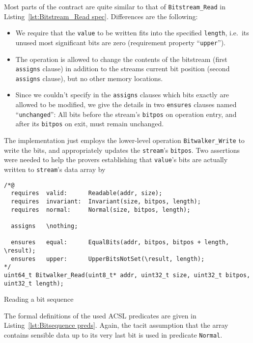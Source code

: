 Most parts of the contract are quite similar to that of
\lstinline{Bitstream_Read} in
Listing~\ref{lst:Bitstream_Read spec}.
%
Differences are the following:
\begin{itemize}
\item We require that the \lstinline{value} to be written fits into
	the specified
	\lstinline{length}, i.e.\ its unused most significant bits
	are zero (requirement property
	``\lstinline{upper}'').
\item The operation is allowed to change the contents of the bitstream
	(first \lstinline{assigns} clause) in addition to the streams
	current bit
	position (second \lstinline{assigns} clause), but no other
	memory locations.
\item Since we couldn't specify in the \lstinline{assigns} clauses 
	which bits exactly are allowed to be modified, we give the
	details in two
	\lstinline{ensures} clauses named ``\lstinline{unchanged}'':
	All bits before the stream's \lstinline{bitpos} on operation
	entry, and after
	its \lstinline{bitpos} on exit, must remain unchanged.
\end{itemize}

The implementation just employs the lower-level operation
\lstinline{Bitwalker_Write} to
write the bits, and appropriately updates the \lstinline{stream}'s
\lstinline{bitpos}.
%
Two assertions were needed to help the provers establishing that
\lstinline{value}'s
bits are actually written to \lstinline{stream}'s data array by
\begin{listing}[hbt]
\begin{minipage}{0.99\textwidth}
\begin{lstlisting}[style=acsl-block]
/*@
  requires  valid:      Readable(addr, size);
  requires  invariant:  Invariant(size, bitpos, length);
  requires  normal:     Normal(size, bitpos, length);

  assigns   \nothing;

  ensures   equal:      EqualBits(addr, bitpos, bitpos + length, \result);
  ensures   upper:      UpperBitsNotSet(\result, length);
*/
uint64_t Bitwalker_Read(uint8_t* addr, uint32_t size, uint32_t bitpos, uint32_t length);
\end{lstlisting}
\end{minipage}
\caption{\label{lst:Bitwalker_Read spec}Reading a bit sequence}
\end{listing}



The formal definitions of the used ACSL predicates are given in
Listing~\ref{lst:Bitsequence preds}.
%
Again, the tacit assumption that the array contains sensible data
up to its very last bit is used in predicate \lstinline{Normal}.



